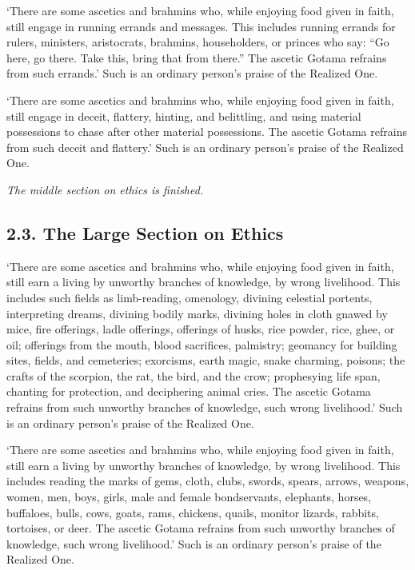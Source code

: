\documentclass[12pt,openany]{book}%
\newcommand*{\scendsection}[1]{\begin{center}\textit{#1}\end{center}}
\begin{document}
‘There are some ascetics and brahmins who, while enjoying food given in faith, still engage in running errands and messages. This includes running errands for rulers, ministers, aristocrats, brahmins, householders, or princes who say: “Go here, go there. Take this, bring that from there.” The ascetic Gotama refrains from such errands.’ Such is an ordinary person’s praise of the Realized One. 

‘There are some ascetics and brahmins who, while enjoying food given in faith, still engage in deceit, flattery, hinting, and belittling, and using material possessions to chase after other material possessions. The ascetic Gotama refrains from such deceit and flattery.’ Such is an ordinary person’s praise of the Realized One. 

\scendsection{The middle section on ethics is finished. }

\subsection*{2.3. The Large Section on Ethics }

‘There are some ascetics and brahmins who, while enjoying food given in faith, still earn a living by unworthy branches of knowledge, by wrong livelihood. This includes such fields as limb-reading, omenology, divining celestial portents, interpreting dreams, divining bodily marks, divining holes in cloth gnawed by mice, fire offerings, ladle offerings, offerings of husks, rice powder, rice, ghee, or oil; offerings from the mouth, blood sacrifices, palmistry; geomancy for building sites, fields, and cemeteries; exorcisms, earth magic, snake charming, poisons; the crafts of the scorpion, the rat, the bird, and the crow; prophesying life span, chanting for protection, and deciphering animal cries. The ascetic Gotama refrains from such unworthy branches of knowledge, such wrong livelihood.’ Such is an ordinary person’s praise of the Realized One. 

‘There are some ascetics and brahmins who, while enjoying food given in faith, still earn a living by unworthy branches of knowledge, by wrong livelihood. This includes reading the marks of gems, cloth, clubs, swords, spears, arrows, weapons, women, men, boys, girls, male and female bondservants, elephants, horses, buffaloes, bulls, cows, goats, rams, chickens, quails, monitor lizards, rabbits, tortoises, or deer. The ascetic Gotama refrains from such unworthy branches of knowledge, such wrong livelihood.’ Such is an ordinary person’s praise of the Realized One. 
\end{document}
